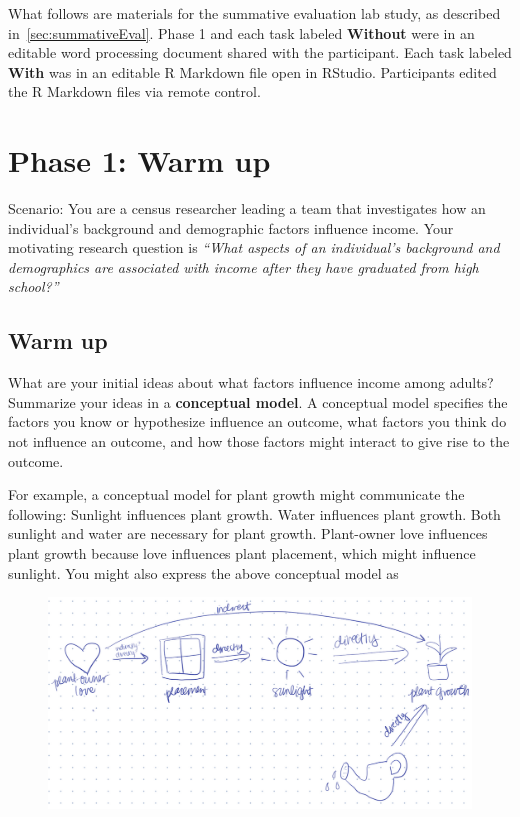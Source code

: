 \normalsize
What follows are materials for the summative evaluation lab study, as described
in~\autoref{sec:summativeEval}. Phase 1 and each task labeled \textbf{Without \rTisane}
were in an editable word processing document shared with the participant. Each
task labeled \textbf{With \rTisane} was in an editable R Markdown file open in RStudio.
Participants edited the R Markdown files via remote control. 

\clearpage 
\section{Phase 1: Warm up}
Scenario: You are a census researcher leading a team that investigates how an
individual’s background and demographic factors influence income. Your
motivating research question is \textit{``What aspects of an individual’s background and
demographics are associated with income after they have graduated from high
school?''}

\subsection*{Warm up}

What are your initial ideas about what factors influence income among adults?
Summarize your ideas in a \textbf{conceptual model}. A conceptual model specifies the
factors you know or hypothesize influence an outcome, what factors you think do
not influence an outcome, and how those factors might interact to give rise to
the outcome. 

For example, a conceptual model for plant growth might communicate
the following: Sunlight influences plant growth. Water influences plant growth.
Both sunlight and water are necessary for plant growth. Plant-owner love
influences plant growth because love influences plant placement, which might
influence sunlight. You might also express the above conceptual model as

\begin{figure}[H]
    \centering
    \includegraphics[width=.85\linewidth]{tisane/figures/example-conceptual-model.png}
\end{figure}

